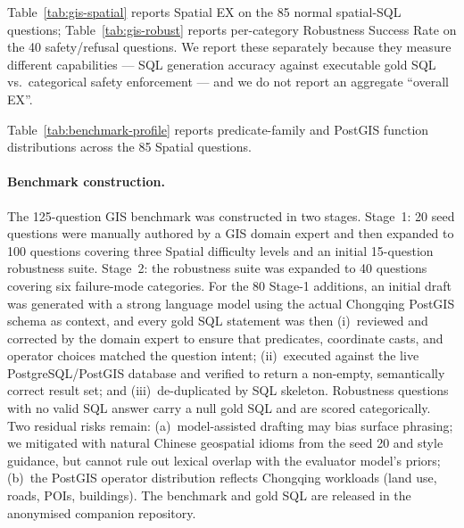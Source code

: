 \documentclass[11pt]{article}
\begin{document}
Table~\ref{tab:gis-spatial} reports Spatial EX on the 85 normal spatial-SQL questions; Table~\ref{tab:gis-robust} reports per-category Robustness Success Rate on the 40 safety/refusal questions. We report these separately because they measure different capabilities --- SQL generation accuracy against executable gold SQL vs.\ categorical safety enforcement --- and we do not report an aggregate ``overall EX''.

Table~\ref{tab:benchmark-profile} reports predicate-family and PostGIS
function distributions across the 85 Spatial questions.
\begin{table}[t]\centering\caption{Composition of the 85-question GIS Spatial
benchmark: a single query may belong to multiple families.}
\label{tab:benchmark-profile}

\end{table}

\paragraph{Benchmark construction.}
The 125-question GIS benchmark was constructed in two stages. Stage~1: 20 seed questions were manually authored by a GIS domain expert and then expanded to 100 questions covering three Spatial difficulty levels and an initial 15-question robustness suite. Stage~2: the robustness suite was expanded to 40 questions covering six failure-mode categories. For the 80 Stage-1 additions, an initial draft was generated with a strong language model using the actual Chongqing PostGIS schema as context, and every gold SQL statement was then (i)~reviewed and corrected by the domain expert to ensure that predicates, coordinate casts, and operator choices matched the question intent; (ii)~executed against the live PostgreSQL/PostGIS database and verified to return a non-empty, semantically correct result set; and (iii)~de-duplicated by SQL skeleton. Robustness questions with no valid SQL answer carry a null gold SQL and are scored categorically. Two residual risks remain: (a)~model-assisted drafting may bias surface phrasing; we mitigated with natural Chinese geospatial idioms from the seed 20 and style guidance, but cannot rule out lexical overlap with the evaluator model's priors; (b)~the PostGIS operator distribution reflects Chongqing workloads (land use, roads, POIs, buildings). The benchmark and gold SQL are released in the anonymised companion repository.
\end{document}
